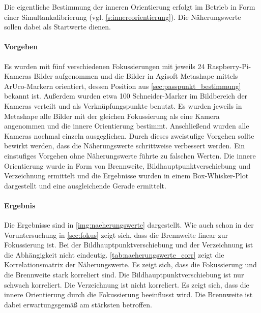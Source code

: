 \documentclass[./00PhotoBox.tex]{subfiles}
\begin{document}
Die eigentliche Bestimmung der inneren Orientierung erfolgt im Betrieb in Form einer Simultankalibrierung (vgl. \autoref{s:innereorientierung}). Die Näherungswerte sollen dabei als Startwerte dienen.

\paragraph{Vorgehen}

Es wurden mit fünf verschiedenen Fokussierungen mit jeweils 24 Raspberry-Pi-Kameras Bilder aufgenommen und die Bilder in Agisoft Metashape mittels ArUco-Markern orientiert, dessen Position aus \autoref{sec:passpunkt_bestimmung} bekannt ist. Außerdem wurden etwa 100 Schneider-Marker im Bildbereich der Kameras verteilt und als Verknüpfungspunkte benutzt. Es wurden jeweils in Metashape alle Bilder mit der gleichen Fokussierung als eine Kamera angenommen und die innere Orientierung bestimmt. Anschließend wurden alle Kameras nochmal einzeln ausgeglichen. Durch dieses zweistufige Vorgehen sollte bewirkt werden, dass die Näherungswerte schrittweise verbessert werden. Ein einstufiges Vorgehen ohne Näherungswerte führte zu falschen Werten. Die innere Orientierung wurde in Form von Brennweite, Bildhauptpunktverschiebung und Verzeichnung ermittelt und die Ergebnisse wurden in einem Box-Whisker-Plot dargestellt und eine ausgleichende Gerade ermittelt.

\paragraph{Ergebnis}

Die Ergebnisse sind in \autoref{img:naeherungswerte} dargestellt. Wie auch schon in der Voruntersuchung in \autoref{sec:fokus} zeigt sich, dass die Brennweite linear zur Fokussierung ist. Bei der Bildhauptpunktverschiebung und der Verzeichnung ist die Abhängigkeit nicht eindeutig. \autoref{tab:naeherungswerte_corr} zeigt die Korrelationsmatrix der Näherungswerte. Es zeigt sich, dass die Fokussierung und die Brennweite stark korreliert sind. Die Bildhauptpunktverschiebung ist nur schwach korreliert. Die Verzeichnung ist nicht korreliert. Es zeigt sich, dass die innere Orientierung durch die Fokussierung beeinflusst wird. Die Brennweite ist dabei erwartungsgemäß am stärksten betroffen.
\end{document}
